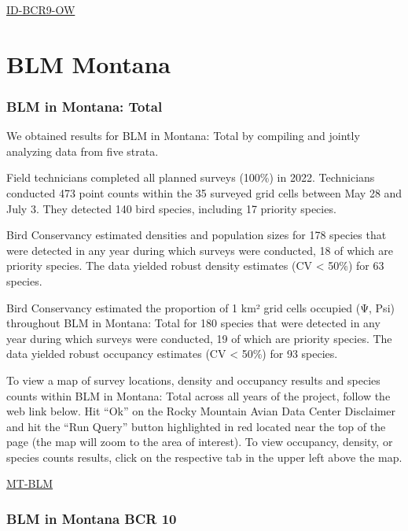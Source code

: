 \documentclass[
  letterpaper,
  DIV=11,
  numbers=noendperiod,
  oneside]{scrreprt}
\begin{document}
\href{http://www.rmbo.org/new_site/adc/QueryWindow.aspx\#N4IgzgLgTghhCuBbEAuABCAkgEQLQCEBhAJQE5cB5AdXX3igFMZ40B7AMzQBkYA7AEzQBZPjADmDRA14Q0uNBQDuATwAWDBmgBiASwYAbQRXbsdAYwYgAvkA}{ID-BCR9-OW}

\hypertarget{blm-montana}{%
\section{BLM Montana}\label{blm-montana}}

\hypertarget{blm-in-montana-total}{%
\subsubsection{BLM in Montana: Total}\label{blm-in-montana-total}}

We obtained results for BLM in Montana: Total by compiling and jointly
analyzing data from five strata.

Field technicians completed all planned surveys (100\%) in 2022.
Technicians conducted 473 point counts within the 35 surveyed grid cells
between May 28 and July 3. They detected 140 bird species, including 17
priority species.

Bird Conservancy estimated densities and population sizes for 178
species that were detected in any year during which surveys were
conducted, 18 of which are priority species. The data yielded robust
density estimates (CV \textless{} 50\%) for 63 species.

Bird Conservancy estimated the proportion of 1 km² grid cells occupied
(Ψ, Psi) throughout BLM in Montana: Total for 180 species that were
detected in any year during which surveys were conducted, 19 of which
are priority species. The data yielded robust occupancy estimates (CV
\textless{} 50\%) for 93 species.

To view a map of survey locations, density and occupancy results and
species counts within BLM in Montana: Total across all years of the
project, follow the web link below. Hit ``Ok'' on the Rocky Mountain
Avian Data Center Disclaimer and hit the ``Run Query'' button
highlighted in red located near the top of the page (the map will zoom
to the area of interest). To view occupancy, density, or species counts
results, click on the respective tab in the upper left above the map.

\href{http://www.rmbo.org/new_site/adc/QueryWindow.aspx\#N4IgzgrgDgpgTmALnAhoiBbEAuABCAWQBUBaAIQBkCQBfIA=}{MT-BLM}

\hypertarget{blm-in-montana-bcr-10}{%
\subsubsection{BLM in Montana BCR 10}\label{blm-in-montana-bcr-10}}
\end{document}
